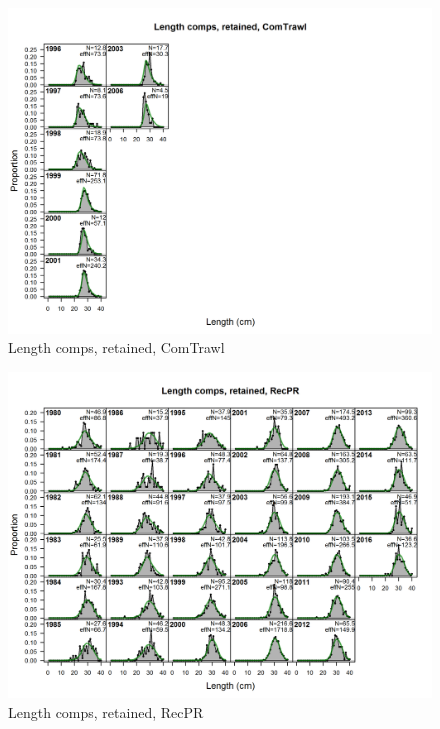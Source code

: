 \documentclass[12pt,]{article}
\begin{document}
\begin{figure}[htbp]
\centering
\includegraphics{./r4ss/plots_mod1/comp_lenfit_flt3mkt2.png}
\caption{Length comps, retained, ComTrawl
\label{fig:mod1_3_comp_lenfit_flt3mkt2}}
\end{figure}

\begin{figure}[htbp]
\centering
\includegraphics{./r4ss/plots_mod1/comp_lenfit_flt4mkt2.png}
\caption{Length comps, retained, RecPR
\label{fig:mod1_4_comp_lenfit_flt4mkt2}}
\end{figure}
\end{document}
